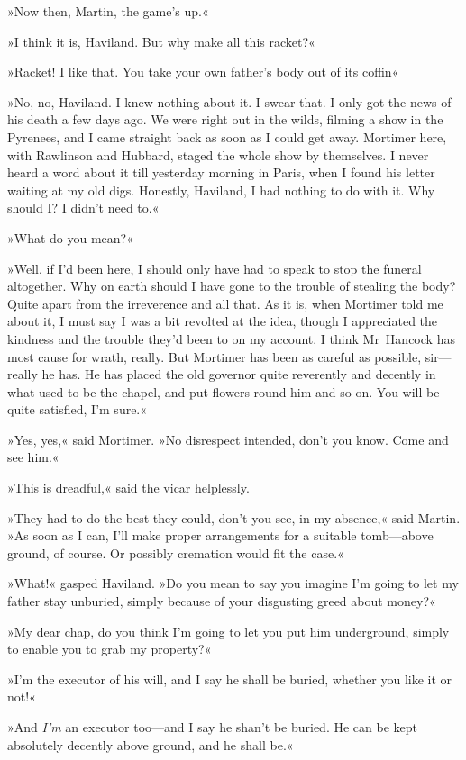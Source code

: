 »Now then, Martin, the game's up.«

»I think it is, Haviland. But why make all this racket?«

»Racket! I like that. You take your own father's body out of its coffin\longdash«

»No, no, Haviland. I knew nothing about it. I swear that. I only got the news of his death a few days ago. We were right out in the wilds, filming a show in the Pyrenees, and I came straight back as soon as I could get away. Mortimer here, with Rawlinson and Hubbard, staged the whole show by themselves. I never heard a word about it till yesterday morning in Paris, when I found his letter waiting at my old digs. Honestly, Haviland, I had nothing to do with it. Why should I\@? I didn't need to.«

»What do you mean?«

»Well, if I'd been here, I should only have had to speak to stop the funeral altogether. Why on earth should I have gone to the trouble of stealing the body? Quite apart from the irreverence and all that. As it is, when Mortimer told me about it, I must say I was a bit revolted at the idea, though I appreciated the kindness and the trouble they'd been to on my account. I think Mr~Hancock has most cause for wrath, really. But Mortimer has been as careful as possible, sir—really he has. He has placed the old governor quite reverently and decently in what used to be the chapel, and put flowers round him and so on. You will be quite satisfied, I'm sure.«

»Yes, yes,« said Mortimer. »No disrespect intended, don't you know. Come and see him.«

»This is dreadful,« said the vicar helplessly.

»They had to do the best they could, don't you see, in my absence,« said Martin. »As soon as I can, I'll make proper arrangements for a suitable tomb—above ground, of course. Or possibly cremation would fit the case.«

»What!« gasped Haviland. »Do you mean to say you imagine I'm going to let my father stay unburied, simply because of your disgusting greed about money?«

»My dear chap, do you think I'm going to let you put him underground, simply to enable you to grab my property?«

»I'm the executor of his will, and I say he shall be buried, whether you like it or not!«

»And \textit{I'm} an executor too—and I say he shan't be buried. He can be kept absolutely decently above ground, and he shall be.«

